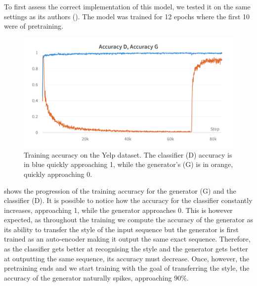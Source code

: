 \documentclass[nomenclature, english, biblatex]{kththesis}
\begin{document}
To first assess the correct implementation of this model, we tested it on the same settings as its authors (\textcite{yang2018unsupervised}). The model was trained for 12 epochs where the first 10 were of pretraining. 
\begin{figure}
    \centering
    \includegraphics[width=\textwidth]{figures/yelp training.png}
    \caption{Training accuracy on the Yelp dataset. The classifier (D) accuracy is in blue quickly approaching 1, while the generator's (G) is in orange, quickly approaching 0.}
    \label{fig:yelp_training}
\end{figure}
 shows the progression of the training accuracy for the generator (G) and the classifier (D). It is possible to notice how the accuracy for the classifier constantly increases, approaching 1, while the generator approaches 0. This is however expected, as throughout the training we compute the accuracy of the generator as its ability to transfer the style of the input sequence but the generator is first trained as an auto-encoder making it output the same exact sequence. Therefore, as the classifier gets better at recognising the style and the generator gets better at outputting the same sequence, its accuracy must decrease. Once, however, the pretraining ends and we start training with the goal of transferring the style, the accuracy of the generator naturally spikes, approaching 90\%. 
\end{document}
